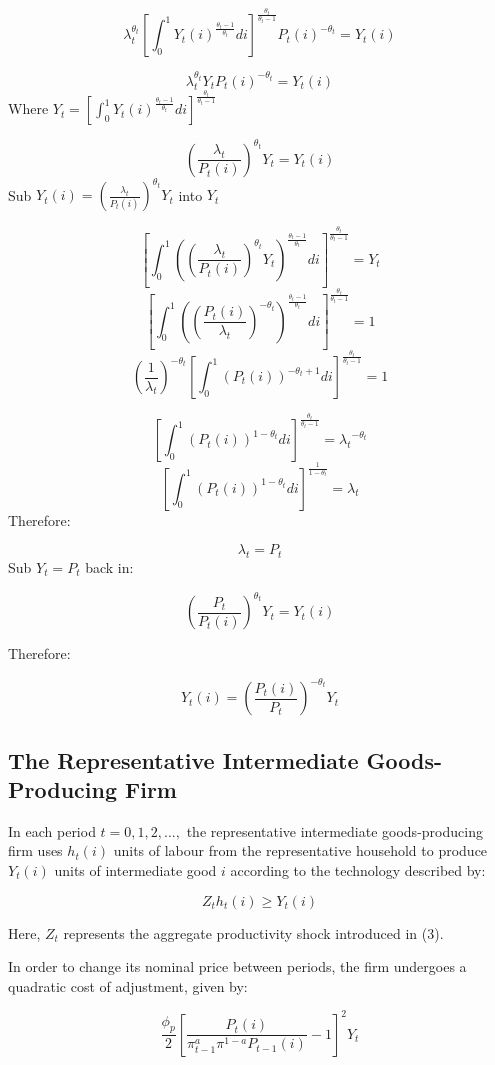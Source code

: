 \documentclass[11pt,preprint, authoryear]{elsarticle}
\numberwithin{equation}{section}
\numberwithin{figure}{section}
\numberwithin{table}{section}
\begin{document}
\[ \lambda_t^{\theta_t} [\int_0^1 Y_t(i)^{\frac{\theta_t-1}{\theta_t}} di]^{\frac{\theta_t}{\theta_t-1}}P_t(i)^{-\theta_t}  = Y_t(i)\]

\[ \lambda_t^{\theta_t} Y_t P_t(i)^{-\theta_t} = Y_t(i)\] Where
\(Y_t = [\int_0^1 Y_t(i)^{\frac{\theta_t-1}{\theta_t}} di]^{\frac{\theta_t}{\theta_t-1}}\)

\[ (\frac{\lambda_t}{P_t(i)})^{\theta_t} Y_t  = Y_t(i)\] Sub
\(Y_t(i) = (\frac{\lambda_t}{P_t(i)})^{\theta_t} Y_t\) into \(Y_t\)

\[[\int_0^1 ((\frac{\lambda_t}{P_t(i)})^{\theta_t} Y_t)^{\frac{\theta_t-1}{\theta_t}} di]^{\frac{\theta_t}{\theta_t-1}}  = Y_t\]
\[[\int_0^1 ((\frac{P_t(i)}{\lambda_t})^{-\theta_t})^{\frac{\theta_t-1}{\theta_t}} di]^{\frac{\theta_t}{\theta_t-1}}  = 1\]
\[(\frac{1}{\lambda_t})^{-\theta_t}[\int_0^1 (P_t(i))^{-\theta_t+1} di]^{\frac{\theta_t}{\theta_t-1}}  = 1\]

\[[\int_0^1 (P_t(i))^{1-\theta_t} di]^{\frac{\theta_t}{\theta_t-1}}  = {\lambda_t}^{-\theta_t}\]
\[[\int_0^1 (P_t(i))^{1-\theta_t} di]^{\frac{1}{1-\theta_t}}  = {\lambda_t}\]
Therefore:

\[\lambda_t = P_t\] Sub \(Y_t = P_t\) back in:

\[(\frac{P_t}{P_t(i)})^{\theta_t} Y_t = Y_t(i)\]

Therefore:

\[Y_t(i) = (\frac{P_t(i)}{P_t})^{-\theta_t} Y_t\]

\hypertarget{the-representative-intermediate-goods-producing-firm}{%
\subsection{The Representative Intermediate Goods-Producing
Firm}\label{the-representative-intermediate-goods-producing-firm}}

In each period \(t=0,1,2,...,\) the representative intermediate
goods-producing firm uses \(h_t(i)\) units of labour from the
representative household to produce \(Y_t(i)\) units of intermediate
good \(i\) according to the technology described by:

\[Z_th_t(i) \ge Y_t(i) \tag{11}\]

Here, \(Z_t\) represents the aggregate productivity shock introduced in
(3).

In order to change its nominal price between periods, the firm undergoes
a quadratic cost of adjustment, given by:

\[\frac{\phi_p}{2}[\frac{P_t(i)}{{\pi_{t-1}^a \pi^{1-a}P_{t-1}(i)}}-1]^2Y_t\]
\end{document}
